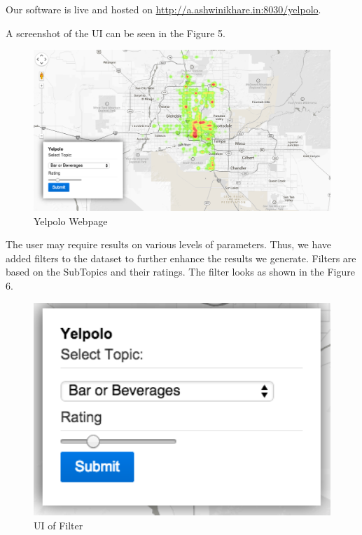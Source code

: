 \documentclass[12pt]{article} %
\begin{document}
Our software is live and hosted on \href{http://a.ashwinikhare.in:8030/yelpolo}{http://a.ashwinikhare.in:8030/yelpolo}. 

A screenshot of the UI can be seen in the Figure 5. 

\begin{figure}[h]
\begin{center}
\includegraphics[width=4.8in]{screen.png}
\caption{Yelpolo Webpage}
\end{center}
\end{figure}

The user may require results on various levels of parameters. Thus, we have added filters to the dataset to further enhance the results we generate. Filters are based on the SubTopics and their ratings. The filter looks as shown in the Figure 6.

\begin{figure}[h]
\begin{center}
\includegraphics[width=4.8in]{filter.png}
\caption{UI of Filter}
\end{center}
\end{figure}
\end{document}
